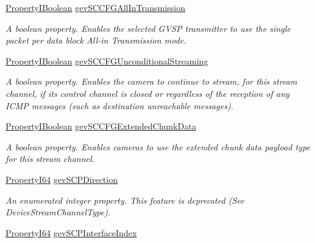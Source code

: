 \begin{DoxyCompactItemize}
\hyperlink{group___common_interface_ga44f9437e24b21b6c93da9039ec6786aa}{Property\+I\+Boolean} \hyperlink{classmv_i_m_p_a_c_t_1_1acquire_1_1_gen_i_cam_1_1_transport_layer_control_aa0e8fc84a4a66ad9b5861988abfd5186}{gev\+S\+C\+C\+F\+G\+All\+In\+Transmission}
\begin{DoxyCompactList}\small\item\em A boolean property. Enables the selected G\+V\+S\+P transmitter to use the single packet per data block All-\/in Transmission mode. \end{DoxyCompactList}\item 
\hyperlink{group___common_interface_ga44f9437e24b21b6c93da9039ec6786aa}{Property\+I\+Boolean} \hyperlink{classmv_i_m_p_a_c_t_1_1acquire_1_1_gen_i_cam_1_1_transport_layer_control_a558802245c7a2b5de6e98fcb63be8e58}{gev\+S\+C\+C\+F\+G\+Unconditional\+Streaming}
\begin{DoxyCompactList}\small\item\em A boolean property. Enables the camera to continue to stream, for this stream channel, if its control channel is closed or regardless of the reception of any I\+C\+M\+P messages (such as destination unreachable messages). \end{DoxyCompactList}\item 
\hyperlink{group___common_interface_ga44f9437e24b21b6c93da9039ec6786aa}{Property\+I\+Boolean} \hyperlink{classmv_i_m_p_a_c_t_1_1acquire_1_1_gen_i_cam_1_1_transport_layer_control_a0c233249933f16f0d9c9e1e08ce704c2}{gev\+S\+C\+C\+F\+G\+Extended\+Chunk\+Data}
\begin{DoxyCompactList}\small\item\em A boolean property. Enables cameras to use the extended chunk data payload type for this stream channel. \end{DoxyCompactList}\item 
\hyperlink{group___common_interface_ga81749b2696755513663492664a18a893}{Property\+I64} \hyperlink{classmv_i_m_p_a_c_t_1_1acquire_1_1_gen_i_cam_1_1_transport_layer_control_a01418fdc96130e97491eadf9fa865767}{gev\+S\+C\+P\+Direction}
\begin{DoxyCompactList}\small\item\em An enumerated integer property. This feature is deprecated (See Device\+Stream\+Channel\+Type). \end{DoxyCompactList}\item 
\hyperlink{group___common_interface_ga81749b2696755513663492664a18a893}{Property\+I64} \hyperlink{classmv_i_m_p_a_c_t_1_1acquire_1_1_gen_i_cam_1_1_transport_layer_control_a2d9f217953d1bb14a5fdfc195c199d94}{gev\+S\+C\+P\+Interface\+Index}

\end{DoxyCompactItemize}

